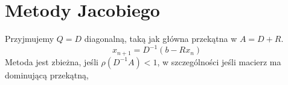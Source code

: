\section{Metody Jacobiego}
Przyjmujemy \( Q = D\) diagonalną, taką jak główna przekątna w \( A = D+R \).
\[
	x_{n+1} = D^{-1}(b - Rx_n)
\]
Metoda jest zbieżna, jeśli \( \rho(D^{-1}A) < 1 \), w szczególności jeśli macierz ma dominującą przekątną,

